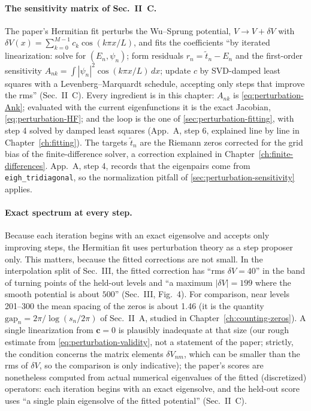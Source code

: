 \paragraph{The sensitivity matrix of Sec.~II~C.}
The paper's Hermitian fit perturbs the Wu--Sprung potential, $V\to V+\delta V$ with $\delta V(x)=\sum_{k=0}^{M-1}c_k\cos(k\pi x/L)$, and fits the coefficients ``by iterated linearization: solve for $(E_n,\psi_n)$; form residuals $r_n=\tilde t_n-E_n$ and the first-order sensitivity $A_{nk}=\int|\psi_n|^2\cos(k\pi x/L)\,dx$; update $c$ by SVD-damped least squares with a Levenberg--Marquardt schedule, accepting only steps that improve the rms'' (Sec.~II~C). Every ingredient is in this chapter: $A_{nk}$ is \cref{eq:perturbation-Ank}; evaluated with the current eigenfunctions it is the exact Jacobian, \cref{eq:perturbation-HF}; and the loop is the one of \cref{sec:perturbation-fitting}, with step 4 solved by damped least squares (App.~A, step 6, explained line by line in Chapter~\ref{ch:fitting}). The targets $\tilde t_n$ are the Riemann zeros corrected for the grid bias of the finite-difference solver, a correction explained in Chapter~\ref{ch:finite-differences}. App.~A, step 4, records that the eigenpairs come from \texttt{eigh\_tridiagonal}, so the normalization pitfall of \cref{sec:perturbation-sensitivity} applies.

\paragraph{Exact spectrum at every step.}
Because each iteration begins with an exact eigensolve and accepts only improving steps, the Hermitian fit uses perturbation theory as a step proposer only. This matters, because the fitted corrections are not small. In the interpolation split of Sec.~III, the fitted correction has ``rms $\delta V=40$'' in the band of turning points of the held-out levels and ``a maximum $|\delta V|=199$ where the smooth potential is about $500$'' (Sec.~III, Fig.~4). For comparison, near levels 201--300 the mean spacing of the zeros is about 1.46 (it is the quantity $\mathrm{gap}_n=2\pi/\log(s_n/2\pi)$ of Sec.~II~A, studied in Chapter~\ref{ch:counting-zeros}). A single linearization from $\bm c=0$ is plausibly inadequate at that size (our rough estimate from \cref{eq:perturbation-validity}, not a statement of the paper; strictly, the condition concerns the matrix elements $\delta V_{nm}$, which can be smaller than the rms of $\delta V$, so the comparison is only indicative); the paper's scores are nonetheless computed from actual numerical eigenvalues of the fitted (discretized) operators: each iteration begins with an exact eigensolve, and the held-out score uses ``a single plain eigensolve of the fitted potential'' (Sec.~II~C).

